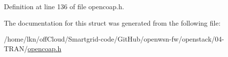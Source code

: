 Definition at line 136 of file opencoap.\+h.



The documentation for this struct was generated from the following file\+:\begin{DoxyCompactItemize}
\item 
/home/lkn/off\+Cloud/\+Smartgrid-\/code/\+Git\+Hub/openwsn-\/fw/openstack/04-\/\+T\+R\+A\+N/\hyperlink{opencoap_8h}{opencoap.\+h}\end{DoxyCompactItemize}
